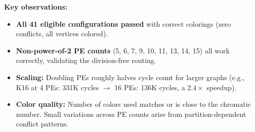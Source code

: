 \documentclass[11pt,letterpaper]{article}
\begin{document}
\noindent\textbf{Key observations:}
\begin{itemize}[nosep]
  \item \textbf{All 41 eligible configurations passed} with correct colorings (zero conflicts, all vertices colored).
  \item \textbf{Non-power-of-2 PE counts} (5, 6, 7, 9, 10, 11, 13, 14, 15) all work correctly, validating the division-free routing.
  \item \textbf{Scaling:} Doubling PEs roughly halves cycle count for larger graphs (e.g., K16 at 4 PEs: 331K cycles $\to$ 16 PEs: 136K cycles, a $2.4\times$ speedup).
  \item \textbf{Color quality:} Number of colors used matches or is close to the chromatic number. Small variations across PE counts arise from partition-dependent conflict patterns.
\end{itemize}
\end{document}
